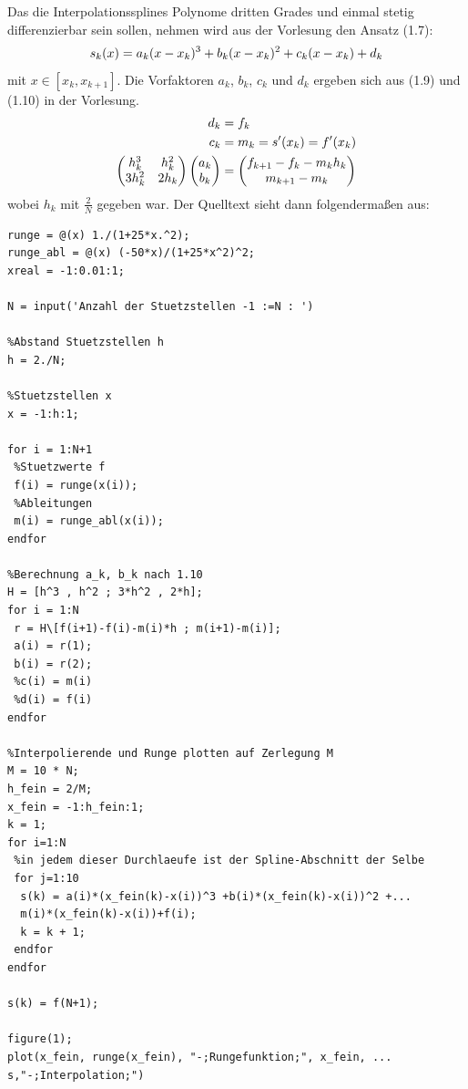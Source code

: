 \documentclass[ngerman,a4paper]{texmf/tex/latex/mathscript/mathscript}
\begin{document}
	Das die Interpolationssplines Polynome dritten Grades und einmal stetig differenzierbar sein sollen, nehmen wird aus der Vorlesung den Ansatz (1.7):
	\begin{align}
		s_k(x) = a_k(x-x_k)^3 + b_k(x-x_k)^2 + c_k(x-x_k) + d_k\notag
	\end{align}
	mit $x\in[x_k,x_{k+1}]$. Die Vorfaktoren $a_k$, $b_k$, $c_k$ und $d_k$ ergeben sich aus (1.9) und (1.10) in der Vorlesung.
	\begin{align}
		d_k &= f_k \notag \\
		c_k &= m_k = s'(x_k) = f'(x_k) \notag \\
		\begin{pmatrix}
			h_k^3 & h_k^2 \\ 3h_k^2 & 2h_k
		\end{pmatrix}\begin{pmatrix}
			a_k \\ b_k
		\end{pmatrix} &= \begin{pmatrix}
			f_{k+1} - f_k - m_kh_k \\ m_{k+1} - m_k
		\end{pmatrix}\notag
	\end{align}
	wobei $h_k$ mit $\frac{2}{N}$ gegeben war. Der Quelltext sieht dann folgendermaßen aus:
	\begin{lstlisting}
runge = @(x) 1./(1+25*x.^2);
runge_abl = @(x) (-50*x)/(1+25*x^2)^2;
xreal = -1:0.01:1;

N = input('Anzahl der Stuetzstellen -1 :=N : ')

%Abstand Stuetzstellen h
h = 2./N;

%Stuetzstellen x
x = -1:h:1;

for i = 1:N+1
 %Stuetzwerte f
 f(i) = runge(x(i));
 %Ableitungen
 m(i) = runge_abl(x(i));
endfor

%Berechnung a_k, b_k nach 1.10
H = [h^3 , h^2 ; 3*h^2 , 2*h];
for i = 1:N
 r = H\[f(i+1)-f(i)-m(i)*h ; m(i+1)-m(i)];
 a(i) = r(1);
 b(i) = r(2);
 %c(i) = m(i)
 %d(i) = f(i)
endfor

%Interpolierende und Runge plotten auf Zerlegung M
M = 10 * N;
h_fein = 2/M;
x_fein = -1:h_fein:1;
k = 1;
for i=1:N
 %in jedem dieser Durchlaeufe ist der Spline-Abschnitt der Selbe
 for j=1:10
  s(k) = a(i)*(x_fein(k)-x(i))^3 +b(i)*(x_fein(k)-x(i))^2 +...
  m(i)*(x_fein(k)-x(i))+f(i);
  k = k + 1;
 endfor
endfor

s(k) = f(N+1);

figure(1);
plot(x_fein, runge(x_fein), "-;Rungefunktion;", x_fein, ...
s,"-;Interpolation;")
	\end{lstlisting}
	
\end{document}
